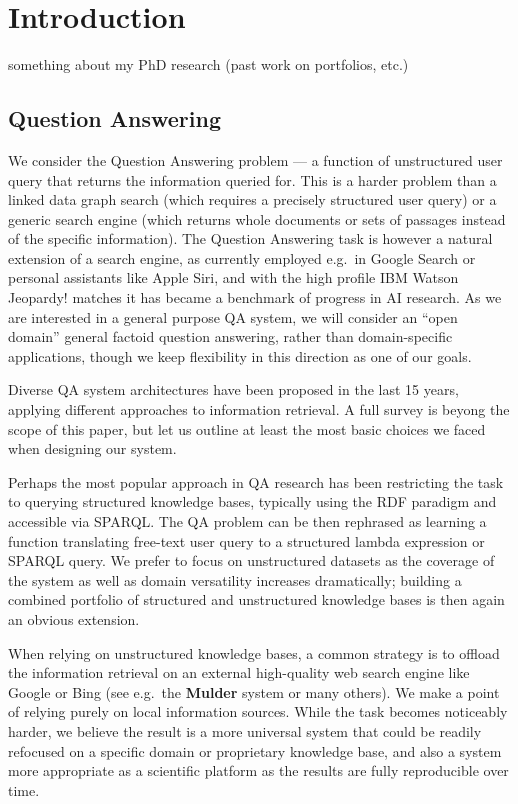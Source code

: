 \chapter{Introduction}

something about my PhD research (past work on portfolios, etc.)

\section{Question Answering}

We consider the Question Answering problem --- a function of
unstructured user query that returns the information queried for.
This is a harder problem than a linked data graph search (which requires
a precisely structured user query) or a generic search engine (which
returns whole documents or sets of passages instead of the specific
information).
The Question Answering task is however a natural extension of a search
engine, as currently employed e.g.\ in Google Search \cite{googleKG}
or personal assistants like Apple Siri, and with the high
profile IBM Watson Jeopardy! matches \cite{WatsonOverview}
it has became a benchmark of progress in AI research.
As we are interested in a general purpose QA system, we will consider
an ``open domain'' general factoid question answering, rather than
domain-specific applications, though we keep flexibility in this direction
as one of our goals.

Diverse QA system architectures have been proposed in the last 15 years,
applying different approaches to information retrieval.  A full survey
is beyong the scope of this paper, but let us outline at least the most
basic choices we faced when designing our system.

Perhaps the most popular approach in QA research has been restricting
the task to querying structured knowledge bases, typically using the
RDF paradigm and accessible via SPARQL\@.  The QA problem can
be then rephrased as learning a function translating free-text user query
to a structured lambda expression or SPARQL query. \cite{Semantic2013Berant} \cite{Semantic2014Bordes}
We prefer to focus on unstructured datasets as the coverage of the system
as well as domain versatility increases dramatically; building a combined
portfolio of structured and unstructured knowledge bases
is then again an obvious extension.

When relying on unstructured knowledge bases, a common strategy is to offload
the information retrieval on an external high-quality web search engine
like Google or Bing (see e.g.\ the \textbf{Mulder} system \cite{MulderKwok}
or many others).
We make a point of relying purely on local information sources.
While the task becomes noticeably harder,
we believe the result is a more
universal system that could be readily refocused on a specific domain
or proprietary knowledge base, and also a system more appropriate as
a scientific platform as the results are fully reproducible over time.

